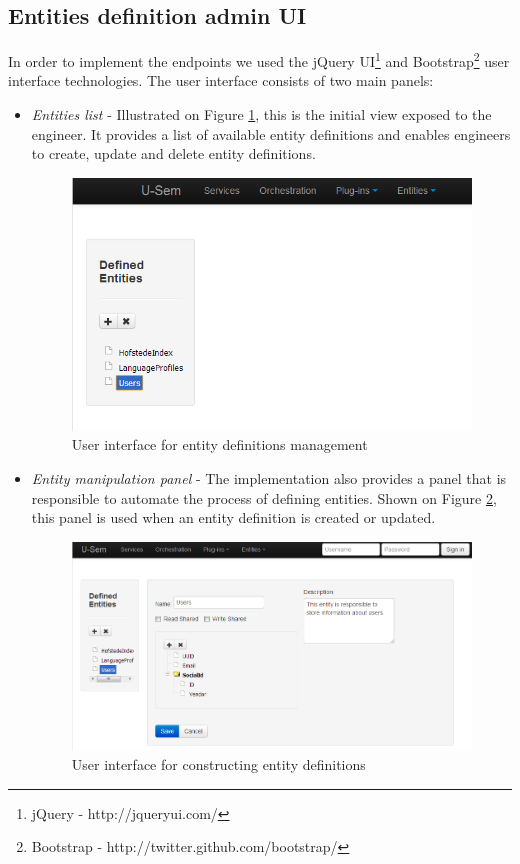 \subsection{Entities definition admin UI}
In order to implement the endpoints we used the jQuery UI\footnote{jQuery - http://jqueryui.com/} and Bootstrap\footnote{Bootstrap - http://twitter.github.com/bootstrap/} user interface technologies. The user interface consists of two main panels:
	\begin{itemize}
	
		\item \textit{Entities list} - Illustrated on Figure \ref{fig:storageEntityList}, this is the initial view exposed to the engineer. It provides a list of available entity definitions and enables engineers to create, update and delete entity definitions.
		
\begin{figure}[h!]
  \centering
  	\includegraphics[scale=0.5]{storage/ui/entityList.png}
  \caption{User interface for entity definitions management}
  \label{fig:storageEntityList}
\end{figure}
		
		\item \textit{Entity manipulation panel} - The implementation also provides a panel that is responsible to automate the process of defining entities. Shown on Figure \ref{fig:storageEntityPanel}, this panel is used when an entity definition is created or updated.
		
\begin{figure}[h!]
  \centering
  	\includegraphics[scale=0.5]{storage/ui/entityPanel.png}
  \caption{User interface for constructing entity definitions}
  \label{fig:storageEntityPanel}
\end{figure}


\end{itemize}
